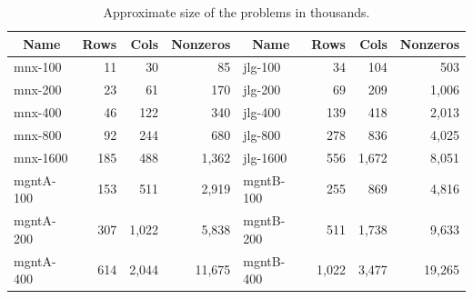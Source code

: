 \setlength{\tabcolsep}{5.9pt}
\begin{table}[ht]
  \begin{center}
    \begin{tabular}{|l||r|r|r||l|r|r|r|} \hline
      \multicolumn{1}{|c||}{Name} & Rows  &  Cols & Nonzeros 
    & \multicolumn{1}{|c||}{Name} & Rows  &  Cols & Nonzeros \\ \hline\hline
      mnx-100   &    11 &    30 &     85
    & jlg-100   &    34 &   104 &    503 \\
      mnx-200   &    23 &    61 &    170
    & jlg-200   &    69 &   209 &  1,006 \\
      mnx-400   &    46 &   122 &    340
    & jlg-400   &   139 &   418 &  2,013 \\
      mnx-800   &    92 &   244 &    680
    & jlg-800   &   278 &   836 &  4,025 \\
      mnx-1600  &   185 &   488 &  1,362
    & jlg-1600  &   556 & 1,672 &  8,051 \\ \hline
      mgntA-100 &   153 &   511 &  2,919
    & mgntB-100 &   255 &   869 &  4,816 \\
      mgntA-200 &   307 & 1,022 &  5,838
    & mgntB-200 &   511 & 1,738 &  9,633 \\
      mgntA-400 &   614 & 2,044 & 11,675
    & mgntB-400 & 1,022 & 3,477 & 19,265 \\ \hline
    \end{tabular}
    \caption{Approximate size of the problems in thousands.}
    \label{table:ProblemSizes}
  \end{center} \vspace{-3ex}
\end{table}

